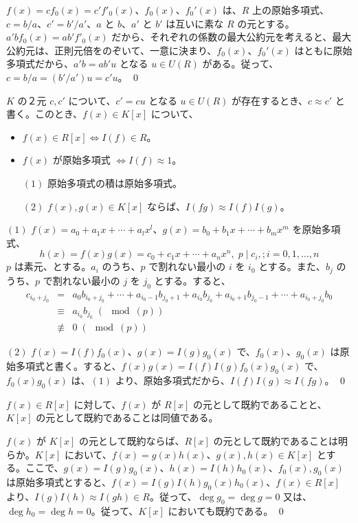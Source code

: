 $f(x) = cf_0(x) = c'f'_0(x)$、$f_0(x)$、$f_0'(x)$ は、$R$ 上の原始多項式、$c = b/a$、$c' = b'/a'$、$a$ と $b$、$a'$ と $b'$ は互いに素な $R$ の元とする。
$a'bf_0(x) = ab'f'_0(x)$ だから、それぞれの係数の最大公約元を考えると、最大公約元は、正則元倍をのぞいて、一意に決まり、$f_0(x)$、$f_0'(x)$ はともに原始多項式だから、$a'b = ab'u$ となる $u\in U(R)$ がある。従って、$c = b/a = (b'/a')u = c'u$。
\qed

\medskip
$K$ の２元 $c, c'$ について、$c' = cu$ となる $u\in U(R)$ が存在するとき、$c\approx c'$ と書く。このとき、$f(x)\in K[x]$ について、
\begin{itemize}
\item $f(x)\in R[x] \Leftrightarrow I(f)\in R$。
\item $f(x) \mbox{ が原始多項式 } \Leftrightarrow I(f)\approx 1$。
\end{itemize}

\begin{lemma} \label{lemma:productofprimitive}
\begin{itemize}
\item[$(1)$] 原始多項式の積は原始多項式。
\item[$(2)$] $f(x), g(x)\in K[x]$ ならば、$I(fg)\approx I(f)I(g)$。
\end{itemize}
\end{lemma}
\proof
$(1)$ $f(x) = a_0 + a_1x + \cdots + a_lx^l$、$g(x) = b_0 + b_1x + \cdots + b_mx^m$ を原始多項式、
$$h(x) = f(x)g(x) = c_0 + c_1x + \cdots + a_nx^n,\;p\mid c_i, ;i = 0,1,\ldots, n$$
$p$ は素元、とする。$a_i$ のうち、$p$ で割れない最小の $i$ を $i_0$ とする。また、$b_j$ のうち、$p$ で割れない最小の $j$ を $j_0$ とする。すると、
\begin{eqnarray*}
c_{i_0+j_0} & = & a_0b_{i_0+j_0}  + \cdots + a_{i_0-1}b_{j_0+1}+ a_{i_0}b_{j_0}+ a_{i_0+1}b_{j_0-1} + \cdots + a_{i_0+j_0}b_0\\
& \equiv & a_{i_0}b_{j_0} \;(\mod (p))\\
& \not\equiv & 0\;(\mod (p))
\end{eqnarray*}

$(2)$ $f(x) = I(f)f_0(x)$、$g(x) = I(g)g_0(x)$ で、$f_0(x)$、$g_0(x)$ は原始多項式と書く。すると、$f(x)g(x) = I(f)I(g)f_0(x)g_0(x)$ で、$f_0(x)g_0(x)$ は、$(1)$ より、原始多項式だから、$I(f)I(g)\approx I(fg)$。
\qed

\begin{prop} \label{prop:gauss'lemma}
$f(x)\in R[x]$ に対して、$f(x)$ が $R[x]$ の元として既約であることと、$K[x]$ の元として既約であることは同値である。
\end{prop}
\proof
$f(x)$ が $K[x]$ の元として既約ならば、$R[x]$ の元として既約であることは明らか。$K[x]$ において、$f(x) = g(x)h(x)$、$g(x), h(x)\in K[x]$ とする。ここで、$g(x) = I(g)g_0(x)$、$h(x) = I(h)h_0(x)$、$f_0(x), g_0(x)$ は原始多項式とすると、$f(x) = I(g)I(h)g_0(x)h_0(x)$、$f(x)\in R[x]$ より、$I(g)I(h)\approx I(gh)\in R$。従って、$\deg g_0 = \deg g = 0$ 又は、$\deg h_0 = \deg h = 0$。従って、$K[x]$ においても既約である。
\qed

